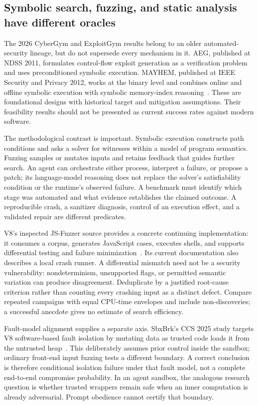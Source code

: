 \subsection{Symbolic search, fuzzing, and static analysis have different oracles}\label{sec:C28:lineage}
The 2026 CyberGym and ExploitGym results belong to an older automated-security lineage, but do not supersede every mechanism in it. AEG, published at NDSS 2011, formulates control-flow exploit generation as a verification problem and uses preconditioned symbolic execution. MAYHEM, published at IEEE Security and Privacy 2012, works at the binary level and combines online and offline symbolic execution with symbolic memory-index reasoning~\cite{avgerinos2011aeg,cha2012mayhem}. These are foundational designs with historical target and mitigation assumptions. Their feasibility results should not be presented as current success rates against modern software.

The methodological contrast is important. Symbolic execution constructs path conditions and asks a solver for witnesses within a model of program semantics. Fuzzing samples or mutates inputs and retains feedback that guides further search. An agent can orchestrate either process, interpret a failure, or propose a patch; its language-model reasoning does not replace the solver's satisfiability condition or the runtime's observed failure. A benchmark must identify which stage was automated and what evidence establishes the claimed outcome. A reproducible crash, a sanitizer diagnosis, control of an execution effect, and a validated repair are different predicates.

V8's inspected JS-Fuzzer source provides a concrete continuing implementation: it consumes a corpus, generates JavaScript cases, executes shells, and supports differential testing and failure minimization~\cite{v8jsfuzzer2026}. Its current documentation also describes a local crash runner. A differential mismatch need not be a security vulnerability: nondeterminism, unsupported flags, or permitted semantic variation can produce disagreement. Deduplicate by a justified root-cause criterion rather than counting every crashing input as a distinct defect. Compare repeated campaigns with equal CPU-time envelopes and include non-discoveries; a successful anecdote gives no estimate of search efficiency.

Fault-model alignment supplies a separate axis. SbxBrk's CCS 2025 study targets V8 software-based fault isolation by mutating data as trusted code loads it from the untrusted heap~\cite{bars2025sfi}. This deliberately assumes prior control inside the sandbox; ordinary front-end input fuzzing tests a different boundary. A correct conclusion is therefore conditional isolation failure under that fault model, not a complete end-to-end compromise probability. In an agent sandbox, the analogous research question is whether trusted wrappers remain safe when an inner computation is already adversarial. Prompt obedience cannot certify that boundary.

